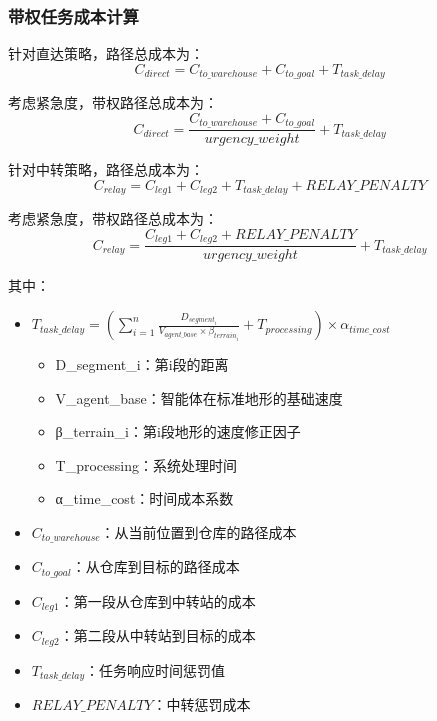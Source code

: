 \documentclass[12pt,a4paper]{article}
\begin{document}
\subsubsection{带权任务成本计算}
针对直达策略，路径总成本为：
\begin{equation}
C_{direct} = C_{to\_warehouse} + C_{to\_goal} + T_{task\_delay}
\end{equation}

考虑紧急度，带权路径总成本为：
\begin{equation}
C_{direct} = \frac{C_{to\_warehouse} + C_{to\_goal} }{urgency\_weight}+ T_{task\_delay}
\end{equation}


针对中转策略，路径总成本为：
\begin{equation}
C_{relay} = C_{leg1} + C_{leg2}+ T_{task\_delay} + {RELAY\_PENALTY} 
\end{equation}

考虑紧急度，带权路径总成本为：
\begin{equation}
C_{relay} = \frac{C_{leg1} + C_{leg2}+ {RELAY\_PENALTY}}{urgency\_weight} + T_{task\_delay}  
\end{equation}

其中：



\begin{itemize}
\item $T_{task\_delay} = \left(\sum_{i=1}^{n} \frac{D_{segment_i}}{V_{agent\_base} \times \beta_{terrain_i}} + T_{processing}\right) \times \alpha_{time\_cost}$
\begin{itemize}
 \item D\_{segment\_i}：第i段的距离
 \item V\_{agent\_base}：智能体在标准地形的基础速度
 \item β\_{terrain\_i}：第i段地形的速度修正因子
 \item T\_{processing}：系统处理时间
 \item α\_{time\_cost}：时间成本系数

\end{itemize}
\item $C_{to\_warehouse}$：从当前位置到仓库的路径成本
\item $C_{to\_goal}$：从仓库到目标的路径成本
\item $C_{leg1}$：第一段从仓库到中转站的成本
\item $C_{leg2}$：第二段从中转站到目标的成本
\item $T_{task\_delay}$：任务响应时间惩罚值
\item $RELAY\_PENALTY$：中转惩罚成本

\end{itemize}
\end{document}
